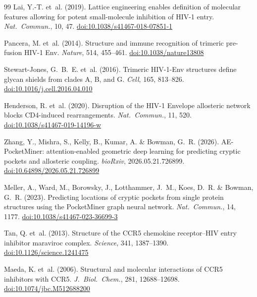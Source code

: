 \documentclass[11pt,a4paper]{article}
\begin{document}
\begin{thebibliography}{99}
Lai, Y.-T. et~al. (2019).
\newblock Lattice engineering enables definition of molecular features allowing for potent small-molecule inhibition of HIV-1 entry.
\newblock \textit{Nat.\ Commun.}, 10, 47.
\newblock \href{https://doi.org/10.1038/s41467-018-07851-1}{doi:10.1038/s41467-018-07851-1}

Pancera, M. et~al. (2014).
\newblock Structure and immune recognition of trimeric pre-fusion HIV-1 Env.
\newblock \textit{Nature}, 514, 455--461.
\newblock \href{https://doi.org/10.1038/nature13808}{doi:10.1038/nature13808}

Stewart-Jones, G.~B.~E. et~al. (2016).
\newblock Trimeric HIV-1-Env structures define glycan shields from clades A, B, and G.
\newblock \textit{Cell}, 165, 813--826.
\newblock \href{https://doi.org/10.1016/j.cell.2016.04.010}{doi:10.1016/j.cell.2016.04.010}

Henderson, R. et~al. (2020).
\newblock Disruption of the HIV-1 Envelope allosteric network blocks CD4-induced rearrangements.
\newblock \textit{Nat.\ Commun.}, 11, 520.
\newblock \href{https://doi.org/10.1038/s41467-019-14196-w}{doi:10.1038/s41467-019-14196-w}

Zhang, Y., Mishra, S., Kelly, B., Kumar, A. \& Bowman, G.~R. (2026).
\newblock AE-PocketMiner: attention-enabled geometric deep learning for predicting cryptic pockets and allosteric coupling.
\newblock \textit{bioRxiv}, 2026.05.21.726899.
\newblock \href{https://doi.org/10.64898/2026.05.21.726899}{doi:10.64898/2026.05.21.726899}

Meller, A., Ward, M., Borowsky, J., Lotthammer, J.~M., Koes, D.~R. \& Bowman, G.~R. (2023).
\newblock Predicting locations of cryptic pockets from single protein structures using the PocketMiner graph neural network.
\newblock \textit{Nat.\ Commun.}, 14, 1177.
\newblock \href{https://doi.org/10.1038/s41467-023-36699-3}{doi:10.1038/s41467-023-36699-3}

Tan, Q. et~al. (2013).
\newblock Structure of the CCR5 chemokine receptor--HIV entry inhibitor maraviroc complex.
\newblock \textit{Science}, 341, 1387--1390.
\newblock \href{https://doi.org/10.1126/science.1241475}{doi:10.1126/science.1241475}

Maeda, K. et~al. (2006).
\newblock Structural and molecular interactions of CCR5 inhibitors with CCR5.
\newblock \textit{J.\ Biol.\ Chem.}, 281, 12688--12698.
\newblock \href{https://doi.org/10.1074/jbc.M512688200}{doi:10.1074/jbc.M512688200}


\end{thebibliography}
\end{document}
